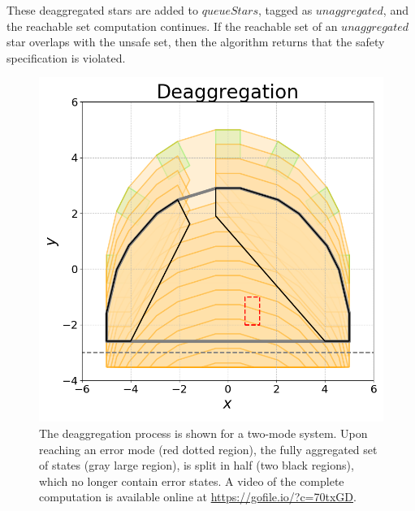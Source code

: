 These deaggregated stars are added to $queueStars$, tagged as $unaggregated$, and the reachable set computation continues. 
%
If the reachable set of an $unaggregated$ star overlaps with the unsafe set, then the algorithm returns that the safety specification is violated.

\begin{figure}[h!]
\centerline{\includegraphics[width=0.7\columnwidth]{images/deagg.png}}
\caption{The deaggregation process is shown for a two-mode system. Upon reaching an error mode (red dotted region), the fully aggregated set of states (gray large region), is split in half (two black regions), which no longer contain error states. A video of the complete computation is available online at \url{https://gofile.io/?c=70txGD}.}
\end{figure}


